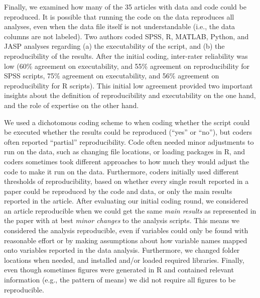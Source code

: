 \documentclass[,jou, a4paper,floatsintext]{apa6}
\begin{document}
Finally, we examined how many of the 35 articles with data and code could be reproduced. It is possible that running the code on the data reproduces all analyses, even when the data file itself is not understandable (i.e., the data columns are not labeled). Two authors coded SPSS, R, MATLAB, Python, and JASP analyses regarding (a) the executability of the script, and (b) the reproducibility of the results. After the initial coding, inter-rater reliability was low (60\% agreement on executability, and 55\% agreement on reproducibility for SPSS scripts, 75\% agreement on executability, and 56\% agreement on reproducibility for R scripts). This initial low agreement provided two important insights about the definition of reproducibility and executability on the one hand, and the role of expertise on the other hand.

We used a dichotomous coding scheme to when coding whether the script could be executed whether the results could be reproduced (\enquote{yes} or \enquote{no}), but coders often reported \enquote{partial} reproducibility. Code often needed minor adjustments to run on the data, such as changing file locations, or loading packages in R, and coders sometimes took different approaches to how much they would adjust the code to make it run on the data. Furthermore, coders initially used different thresholds of reproducibility, based on whether every single result reported in a paper could be reproduced by the code and data, or only the main results reported in the article. After evaluating our initial coding round, we considered an article reproducible when we could get the same \emph{main results} as represented in the paper with at best \emph{minor changes} to the analysis scripts. This means we considered the analysis reproducible, even if variables could only be found with reasonable effort or by making assumptions about how variable names mapped onto variables reported in the data analysis. Furthermore, we changed folder locations when needed, and installed and/or loaded required libraries. Finally, even though sometimes figures were generated in R and contained relevant information (e.g., the pattern of means) we did not require all figures to be reproducible.
\end{document}
